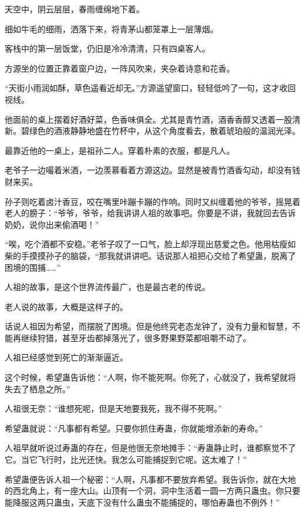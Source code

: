 
\begin{this_body}



天空中，阴云层层，春雨缠绵地下着。

细如牛毛的细雨，洒落下来，将青茅山都笼罩上一层薄烟。

客栈中的第一层饭堂，仍旧是冷冷清清，只有四桌客人。

方源坐的位置正靠着窗户边，一阵风吹来，夹杂着诗意和花香。

“天街小雨润如酥，草色遥看近却无。”方源遥望窗口，轻轻低吟了一句，这才收回视线。

他面前的桌上摆着好酒好菜，色香味俱全。尤其是青竹酒，酒香香醇又透着一股清新。碧绿色的酒液静静地盛在竹杯中，从这个角度看去，散着琥珀般的温润光泽。

最靠近他的一桌上，是祖孙二人。穿着朴素的衣服，都是凡人。

老爷子一边嘬着米酒，一边羡慕看着方源这边。显然是被青竹酒香勾动，却没有钱财来买。

孙子则吃着卤汁香豆，咬在嘴里咔蹦卡蹦的作响。同时又纠缠着他的爷爷，摇晃着老人的膀子：“爷爷，爷爷，给我讲讲人祖的故事吧。你要是不讲，我就回去告诉奶奶，说你出来偷酒喝！”

“唉，吃个酒都不安稳。”老爷子叹了一口气，脸上却浮现出慈爱之色。他用枯瘦如柴的手摸摸孙子的脑袋，“那我就讲讲吧。话说那人祖把心交给了希望蛊，脱离了困境的围捕……”

人祖的故事，是这个世界流传最广，也是最古老的传说。

老人说的故事，大概是这样子的。

话说人祖因为希望，而摆脱了困境。但是他终究老态龙钟了，没有力量和智慧，不能再继续狩猎，甚至牙齿都掉落光了，很多野果野菜都咀嚼不动了。

人祖已经感觉到死亡的渐渐逼近。

这个时候，希望蛊告诉他：“人啊，你不能死啊。你死了，心就没了，我希望就将失去了栖息之所。”

人祖很无奈：“谁想死呢，但是天地要我死，我不得不死啊。”

希望蛊就说：“凡事都有希望。只要你抓住寿蛊，你就能增添新的寿命。”

人祖早就听说过寿蛊的存在，但是他很无奈地摊手：“寿蛊静止时，谁都察觉不了它。当它飞行时，比光还快。我怎么可能捕捉到它呢。这太难了！”

希望蛊便告诉人祖一个秘密：“人啊，凡事都不要放弃希望。我告诉你，就在大地的西北角上，有一座大山。山顶有一个洞，洞中生活着一圆一方两只蛊虫。你只要能降服这两只蛊虫，天底下没有什么蛊虫不能捕捉的，哪怕寿蛊也不例外！”


\end{this_body}
